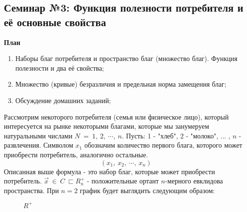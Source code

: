 \documentclass[12pt,a4paper]{article}
\author{GH-TIMe}
\begin{document}
\begin{center}
\section*{Семинар №3: Функция полезности потребителя и её основные свойства}
\textbf{План}
\end{center}

\begin{enumerate}
\item Наборы благ потребителя и пространство благ (множество благ). Функция полезности и два её свойства;
\item Множество (кривые) безразличия и предельная норма замещения благ;
\item Обсуждение домашних заданий;
\end{enumerate}

	Рассмотрим некоторого потребителя (семья или физическое лицо), который интересуется на рынке некоторыми благами, которые мы занумеруем натуральными числами $\displaystyle N\ =\ 1,\ 2,\ \cdots ,\ n$. Пусть: 1 - "хлеб", 2 - "молоко", ... , $\displaystyle n$ - развлечения. Символом $\displaystyle x_{1}$ обозначим количество первого блага, которого может приобрести потребитель, аналогично остальные.
\begin{equation*}
( x_{1} ,\ x_{2} ,\ \cdots ,\ x_{n})
\end{equation*}
	Описанная выше формула - это набор благ, которые может приобрести потребитель. $\displaystyle \vec{x} \ \in \ C\ \sqsubset R^{+}_{n}$ - положительные ортант $\displaystyle n$-мерного евклидова пространства. При $\displaystyle n=2$ график будет выглядить следующим образом:

\begin{figure}[H]

\begin{center}

\end{center}
\caption{$R^+$}
\end{figure}
\end{document}
